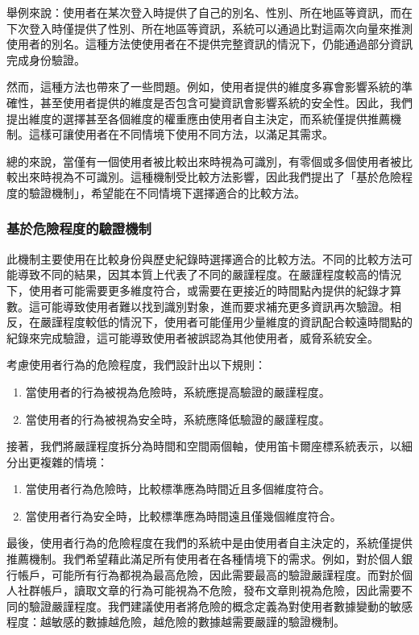 舉例來說：使用者在某次登入時提供了自己的別名、性別、所在地區等資訊，而在下次登入時僅提供了性別、所在地區等資訊，系統可以通過比對這兩次向量來推測使用者的別名。這種方法使使用者在不提供完整資訊的情況下，仍能通過部分資訊完成身份驗證。

然而，這種方法也帶來了一些問題。例如，使用者提供的維度多寡會影響系統的準確性，甚至使用者提供的維度是否包含可變資訊會影響系統的安全性。因此，我們提出維度的選擇甚至各個維度的權重應由使用者自主決定，而系統僅提供推薦機制。這樣可讓使用者在不同情境下使用不同方法，以滿足其需求。

總的來說，當僅有一個使用者被比較出來時視為可識別，有零個或多個使用者被比較出來時視為不可識別。這種機制受比較方法影響，因此我們提出了「基於危險程度的驗證機制」，希望能在不同情境下選擇適合的比較方法。
\subsubsection{基於危險程度的驗證機制}
此機制主要使用在比較身份與歷史紀錄時選擇適合的比較方法。不同的比較方法可能導致不同的結果，因其本質上代表了不同的嚴謹程度。在嚴謹程度較高的情況下，使用者可能需要更多維度符合，或需要在更接近的時間點內提供的紀錄才算數。這可能導致使用者難以找到識別對象，進而要求補充更多資訊再次驗證。相反，在嚴謹程度較低的情況下，使用者可能僅用少量維度的資訊配合較遠時間點的紀錄來完成驗證，這可能導致使用者被誤認為其他使用者，威脅系統安全。

考慮使用者行為的危險程度，我們設計出以下規則：
\begin{enumerate}
  \item 當使用者的行為被視為危險時，系統應提高驗證的嚴謹程度。
  \item 當使用者的行為被視為安全時，系統應降低驗證的嚴謹程度。
\end{enumerate}

接著，我們將嚴謹程度拆分為時間和空間兩個軸，使用笛卡爾座標系統表示，以細分出更複雜的情境：
\begin{enumerate}
  \item 當使用者行為危險時，比較標準應為時間近且多個維度符合。
  \item 當使用者行為安全時，比較標準應為時間遠且僅幾個維度符合。
\end{enumerate}

最後，使用者行為的危險程度在我們的系統中是由使用者自主決定的，系統僅提供推薦機制。我們希望藉此滿足所有使用者在各種情境下的需求。例如，對於個人銀行帳戶，可能所有行為都視為最高危險，因此需要最高的驗證嚴謹程度。而對於個人社群帳戶，讀取文章的行為可能視為不危險，發布文章則視為危險，因此需要不同的驗證嚴謹程度。我們建議使用者將危險的概念定義為對使用者數據變動的敏感程度：越敏感的數據越危險，越危險的數據越需要嚴謹的驗證機制。
